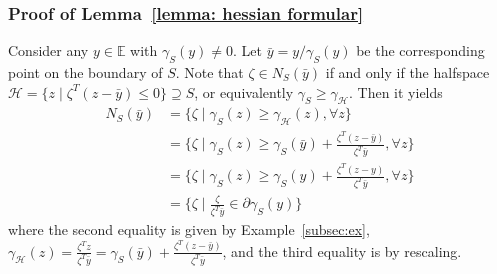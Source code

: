 \documentclass[sn-mathphys,Numbered]{sn-jnl}%
\begin{document}
\begin{appendices}
{%

\subsubsection{Proof of Lemma~\ref{lemma: hessian formular}}    \label{pf: hessian formular}
Consider any $y\in \mathbb{E}$ with $\gamma_S(y)\neq 0$.
Let $\bar y = y/\gamma_S(y)$ be the corresponding point on the boundary of $S$. Note that $\zeta \in N_S(\bar y)$ if and only if the halfspace $\mathcal{H} = \{z \mid \zeta^T(z-\bar y) \leq 0\} \supseteq{S}$, or equivalently $\gamma_{S} \geq \gamma_{\mathcal{H}} $. Then it yields
\begin{align*}
    N_S(\bar y) &= \{\zeta \mid \gamma_S(z) \geq \gamma_{\mathcal {H}}(z), \forall z \} \\
    &=\{\zeta \mid \gamma_S(z) \geq \gamma_S(\bar y)+\frac{\zeta^T(z-\bar y)}{\zeta^T \bar y}, \forall z \} \\
    &=\{\zeta \mid \gamma_S(z) \geq \gamma_S(y)+\frac{\zeta^T(z-y)}{\zeta^T \bar y}, \forall z\} \\
    &=\{\zeta \mid \frac{\zeta}{\zeta^T \bar y} \in \partial \gamma_S(y)\}
\end{align*}
where the second equality is given by Example~\ref{subsec:ex}, $\gamma_{\mathcal{H}}(z)=\frac{\zeta^Tz}{\zeta^T \bar y} = \gamma_S(\bar y)+ \frac{\zeta^T(z-\bar y)}{\zeta^T \bar y}$, and the third equality is by rescaling.

}
\end{appendices}
\end{document}
